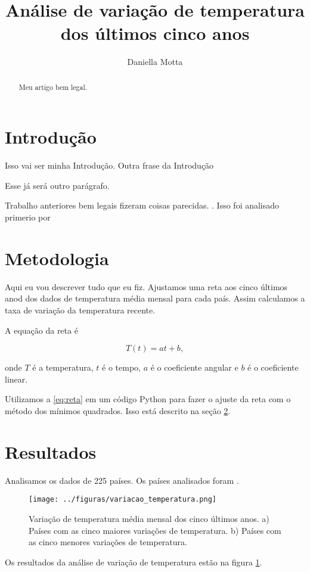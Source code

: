 \documentclass{article}
\newcommand{\Title}{Análise de variação de temperatura dos últimos cinco anos}
\begin{document}
\title{\Title}
\author{Daniella Motta}

\maketitle
\begin{abstract}
    Meu artigo bem legal.
\end{abstract}


\section{Introdução}
Isso vai ser minha Introdução.
Outra frase da Introdução

Esse já será outro parágrafo.

Trabalho anteriores bem legais fizeram coisas parecidas.
\citep{Hansen2010}.
Isso foi analisado primerio por \citet{Hansen2010}

\section{Metodologia}
\label{sec:metodos}

Aqui eu vou descrever tudo que eu fiz.
Ajustamos uma reta aos cinco últimos anod dos dados
de temperatura média mensal para cada país.
Assim calculamos a taxa de variação da temperatura recente.

A equação da reta é

\begin{equation}
T(t) = a t + b,
\label{eq:reta}
\end{equation}

\noindent
onde  $T$ é a temperatura, $t$ é o tempo, $a$ é o coeficiente angular e $b$ é o coeficiente linear.

Utilizamos a \ref{eq:reta} em um código Python para fazer o ajuste da reta com o método dos mínimos quadrados.
Isso está descrito na seção \ref{sec:metodos}.

\section{Resultados}

Analisamos os dados de 225 países. 
Os países analisados foram \Paises.

\begin{figure} [!tb]
    \centering
    \texttt{[image: ../figuras/variacao\_temperatura.png]}
    \caption{
        Variação de temperatura média mensal dos cinco últimos anos.
        a) Países com as cinco maiores variações de temperatura.
        b) Países com as cinco menores variações de temperatura.
    }
    \label{fig:variacao}

\end{figure}
Os resultados da análise de variação de temperatura estão na figura \ref{fig:variacao}.



\end{document}
